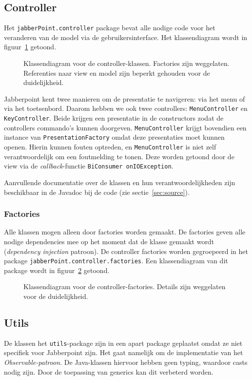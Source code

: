\documentclass[a4paper]{article}
\newcommand{\code}[1]{\lstinline[columns=fixed]{#1}}
\newcommand{\diagram}[3][1.3]{
	\begin{figure}[!htb]
	 \caption{#3}
	 \label{diagram:#2}
	 \makebox[\textwidth][c]{\texttt{[image: Diagrams/\#2.pdf]}}%
	\end{figure}
}
\begin{document}
	\subsection{Controller}\label{sec:controller}
		Het \code{jabberPoint.controller} package bevat alle nodige code voor het veranderen van de model via de gebruikersinterface.
		Het klassendiagram wordt in figuur~\ref{diagram:controller} getoond.

		\diagram{controller}{
			Klassendiagram voor de controller-klassen.
			Factories zijn weggelaten.
			Referenties naar view en model zijn beperkt gehouden voor de duidelijkheid.
		}

		Jabberpoint kent twee manieren om de presentatie te navigeren: via het menu of via het toetsenbord.
		Daarom hebben we ook twee controllers: \code{Menu}\-\code{Controller} en \code{KeyController}.
		Beide krijgen een presentatie in de constructors zodat de controllers commando's kunnen doorgeven.
		\code{MenuController} krijgt bovendien een instance van \code{PresentationFactory} omdat deze presentaties moet kunnen openen.
		Hierin kunnen fouten optreden, en \code{MenuController} is niet zelf verantwoordelijk om een foutmelding te tonen.
		Deze worden getoond door de view via de \textit{callback}-functie \code{BiConsumer onIOException}.

		Aanvullende documentatie over de klassen en hun verantwoordelijkheden zijn beschikbaar in de Javadoc bij de code (zie sectie~\ref{sec:source}).

		\subsubsection{Factories}\label{sec:controller-factories}
			Alle klassen mogen alleen door factories worden gemaakt.
			De factories geven alle nodige dependencies mee op het moment dat de klasse gemaakt wordt (\textit{dependency injection} patroon).
			De controller factories worden gegroepeerd in het package \code{jabberPoint.controller.factories}.
			Een klassendiagram van dit package wordt in figuur~\ref{diagram:controller-factories} getoond.

			\diagram[0.8]{controller-factories}{
				Klassendiagram voor de controller-factories.
				Details zijn weggelaten voor de duide\-lijk\-heid.
			}

	\subsection{Utils}\label{sec:utils}
		De klassen het \code{utils}-package zijn in een apart package geplaatst omdat ze niet specifiek voor Jabberpoint zijn.
		Het gaat namelijk om de implementatie van het \textit{Observable-patroon}.
		De Java-klassen hiervoor hebben geen typing, waardoor casts nodig zijn.
		Door de toepassing van generics kan dit verbeterd worden.
		
\end{document}

